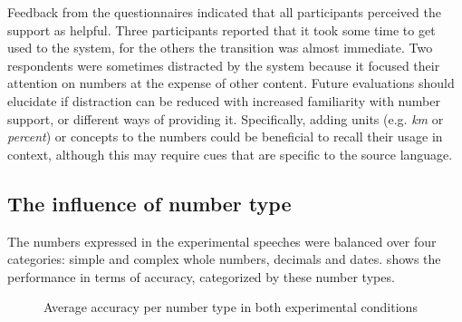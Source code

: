\documentclass[output=paper]{langsci/langscibook}
\begin{document}
Feedback from the questionnaires indicated that all participants perceived the support as helpful. Three participants reported that it took some time to get used to the system, for the others the transition was almost immediate. Two respondents were sometimes distracted by the system because it focused their attention on numbers at the expense of other content. Future evaluations should elucidate if distraction can be reduced with increased familiarity with number support, or different ways of providing it. Specifically, adding units (e.g. \textit{km} or \textit{percent}) or concepts to the numbers could be beneficial to recall their usage in context, although this may require cues that are specific to the source language.

\subsection{The influence of number type}
The numbers expressed in the experimental speeches were balanced over four categories: simple and complex whole numbers, decimals and dates.  shows the performance in terms of accuracy, categorized by these number types.

\begin{figure}
\caption{Average accuracy per number type in both experimental conditions\label{fig:01:2}}
\end{figure}
\end{document}
